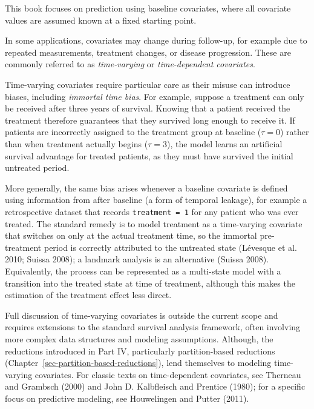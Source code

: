 \documentclass[
  letterpaper,
  krantz2]{style/krantz}
\begin{document}
\begin{tcolorbox}[enhanced jigsaw, toprule=.15mm, bottomtitle=1mm, opacityback=0, breakable, leftrule=.75mm, title={Time-varying covariates and immortal time bias}, toptitle=1mm, bottomrule=.15mm, colback=white, colframe=quarto-callout-note-color-frame, titlerule=0mm, opacitybacktitle=0.6, coltitle=black, rightrule=.15mm, left=2mm, colbacktitle=quarto-callout-note-color!10!white, arc=.35mm]

This book focuses on prediction using baseline covariates, where all
covariate values are assumed known at a fixed starting point.

In some applications, covariates may change during follow-up, for
example due to repeated measurements, treatment changes, or disease
progression. These are commonly referred to as
\emph{time-varying} or
\emph{time-dependent covariates}.

Time-varying covariates require particular care as their misuse can
introduce biases, including \emph{immortal time
bias}. For example, suppose a treatment can
only be received after three years of survival. Knowing that a patient
received the treatment therefore guarantees that they survived long
enough to receive it. If patients are incorrectly assigned to the
treatment group at baseline (\(\tau=0\)) rather than when treatment
actually begins (\(\tau=3\)), the model learns an artificial survival
advantage for treated patients, as they must have survived the initial
untreated period.

More generally, the same bias arises whenever a baseline covariate is
defined using information from after baseline (a form of temporal
leakage), for example a retrospective dataset that records
\texttt{treatment\ =\ 1} for any patient who was ever treated. The
standard remedy is to model treatment as a time-varying covariate that
switches on only at the actual treatment time, so the immortal
pre-treatment period is correctly attributed to the untreated state
(Lévesque et al. 2010; Suissa 2008); a landmark analysis is an
alternative (Suissa 2008). Equivalently, the process can be represented
as a multi-state model with a transition into the treated state at time
of treatment, although this makes the estimation of the treatment effect
less direct.

Full discussion of time-varying covariates is outside the current scope
and requires extensions to the standard survival analysis framework,
often involving more complex data structures and modeling assumptions.
Although, the reductions introduced in Part IV, particularly
partition-based reductions
(Chapter~\ref{sec-partition-based-reductions}), lend themselves to
modeling time-varying covariates. For classic texts on time-dependent
covariates, see Therneau and Grambsch (2000) and John D. Kalbfleisch and
Prentice (1980); for a specific focus on predictive modeling, see
Houwelingen and Putter (2011).

\end{tcolorbox}
\end{document}
